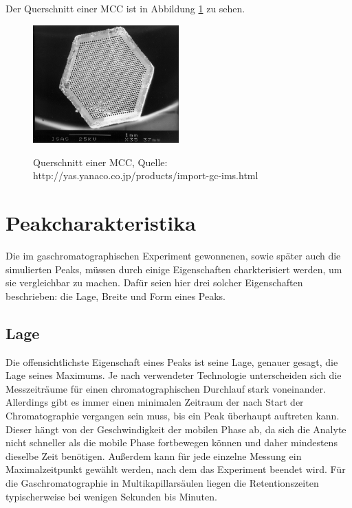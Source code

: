 Der Querschnitt einer MCC ist in Abbildung \ref{MCC} zu sehen.

\begin{figure}[h]
 \centering
  \includegraphics[width = 0.5\textwidth]{bilder/MultiCapillaryColumn}\\
  \caption[Querschnitt einer MCC]{Querschnitt einer MCC, Quelle: http://yas.yanaco.co.jp/products/import-gc-ims.html}
  \label{MCC}
\end{figure}

\section{Peakcharakteristika}
Die im gaschromatographischen Experiment gewonnenen, sowie später auch die simulierten Peaks, müssen durch einige Eigenschaften charkterisiert werden, um sie vergleichbar zu machen. Dafür seien hier drei solcher Eigenschaften beschrieben: die Lage, Breite und Form eines Peaks.


\subsection{Lage}
Die offensichtlichste Eigenschaft eines Peaks ist seine Lage, genauer gesagt, die Lage seines Maximums. Je nach verwendeter Technologie unterscheiden sich die Messzeiträume für einen chromatographischen Durchlauf stark voneinander. %
Allerdings gibt es immer einen minimalen Zeitraum der nach Start der Chromatographie vergangen sein muss, bis ein Peak überhaupt auftreten kann. Dieser hängt von der Geschwindigkeit der mobilen Phase ab, da sich die Analyte nicht schneller als die mobile Phase fortbewegen können und daher mindestens dieselbe Zeit benötigen. Außerdem kann für jede einzelne Messung ein Maximalzeitpunkt gewählt werden, nach dem das Experiment beendet wird.
Für die Gaschromatographie in Multikapillarsäulen liegen die Retentionszeiten typischerweise bei wenigen Sekunden bis Minuten.


